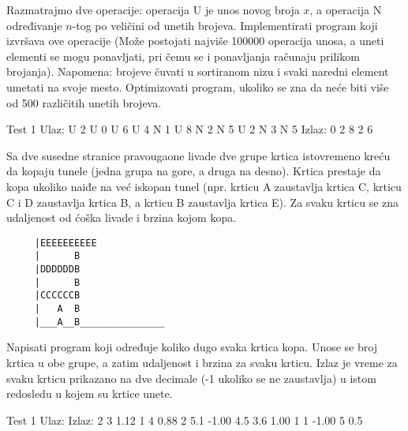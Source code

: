 \begin{Exercise}[label=510]
  Razmatrajmo dve operacije: operacija U je unos novog broja $x$, a
  operacija N određivanje $n$-tog po veličini od unetih
  brojeva. Implementirati program koji izvršava ove operacije (Može
  postojati najviše 100000 operacija unosa, a uneti elementi se mogu
  ponavljati, pri čemu se i ponavljanja računaju prilikom
  brojanja). Napomena: brojeve čuvati u sortiranom nizu i svaki
  naredni element umetati na svoje mesto. Optimizovati program,
  ukoliko se zna da neće biti više od 500 različitih unetih brojeva.
  
\begin{maxitest}
\begin{test}{Test 1}
Ulaz: U 2 U 0 U 6 U 4 N 1 U 8 N 2 N 5 U 2 N 3 N 5
Izlaz: 0 2 8 2 6
\end{test}
\end{maxitest}
  
\end{Exercise}

\begin{Exercise}[label=511]
  Sa dve susedne stranice pravougaone livade dve grupe krtica
  istovremeno kreću da kopaju tunele (jedna grupa na gore, a druga na
  desno). Krtica prestaje da kopa ukoliko naiđe na već iskopan tunel
  (npr. krticu A zaustavlja krtica C, krticu C i D zaustavlja krtica
  B, a krticu B zaustavlja krtica E). Za svaku krticu se zna
  udaljenost od ćoška livade i brzina kojom kopa.
\begin{verbatim}
     |EEEEEEEEEE
     |      B
     |DDDDDDB 
     |      B
     |CCCCCCB
     |   A  B
     |___A__B_______________
\end{verbatim}
Napisati program koji određuje koliko dugo svaka krtica kopa. Unose
se broj krtica u obe grupe, a zatim udaljenost i brzina za svaku
krticu. Izlaz je vreme za svaku krticu prikazano na dve decimale (-1
ukoliko se ne zaustavlja) u istom redosledu u kojem su krtice unete.

\begin{miditest}
\begin{test}{Test 1}
Ulaz:          Izlaz:
2 3            1.12
1   4          0.88
2   5.1        -1.00
4.5 3.6        1.00
1   1          -1.00
5   0.5
\end{test}
\end{miditest}
  
\end{Exercise}


